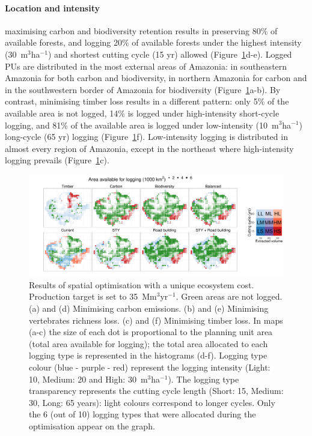 \documentclass{article}
\begin{document}
\paragraph{Location and intensity}

maximising carbon and biodiversity retention results in preserving 80\% of available forests, and logging 20\% of available forests under the highest intensity (30~m$^3$ha$^{-1}$) and shortest cutting cycle (15 yr) allowed (Figure~\ref{fig:uniqueCost}d-e). Logged PUs are distributed in the most external areas of Amazonia: in southeastern Amazonia for both carbon and biodiversity, in northern Amazonia for carbon and in the southwestern border of Amazonia for biodiversity (Figure~\ref{fig:uniqueCost}a-b). By contrast, minimising timber loss results in a different pattern: only 5\% of the available area is not logged, 14\% is logged under high-intensity short-cycle logging, and 81\% of the available area is logged under low-intensity (10~m$^3$ha$^{-1}$) long-cycle (65 yr) logging (Figure~\ref{fig:uniqueCost}f). Low-intensity logging is distributed in almost every region of Amazonia, except in the northeast where high-intensity logging prevails (Figure~\ref{fig:uniqueCost}c). 

\begin{figure}
    \centering
    \includegraphics[width=\linewidth]{graphs/mapsScenOutcome.pdf}
    \caption{Results of spatial optimisation with a unique ecosystem cost. Production target is set to 35~Mm$^3$yr$^{-1}$. Green areas are not logged. (a) and (d) Minimising carbon emissions. (b) and (e) Minimising vertebrates richness loss. (c) and (f) Minimising timber loss. In maps (a-c) the size of each dot is proportional to the planning unit area (total area available for logging); the total area allocated to each logging type is represented in the histograms (d-f). Logging type colour (blue - purple - red) represent the logging intensity (Light: 10, Medium: 20 and High: 30~m$^3$ha$^{-1}$). The logging type transparency represents the cutting cycle length (Short: 15, Medium: 30, Long: 65 years): light colours correspond to longer cycles. Only the 6 (out of 10) logging types that were allocated during the optimisation appear on the graph.}
    \label{fig:uniqueCost}
    
\end{figure}
\end{document}
